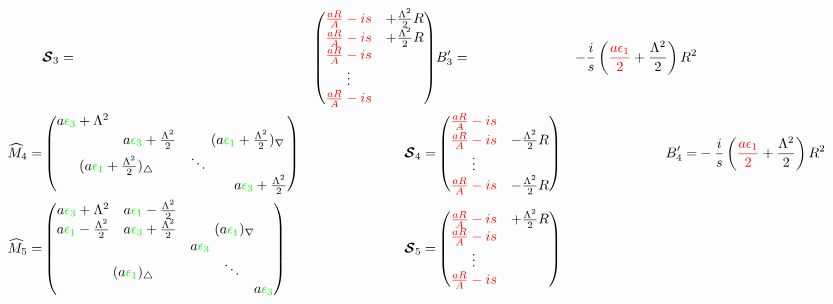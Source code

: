 \documentclass[aps,prd,onecolumn
,tightenlines,letterpaper,
notitlepage,11pt,
nofootinbib]{revtex4-1}
\begin{document}
\begin{align*}
&
\ve{\cS}_3 =&\begin{pmatrix}\red{\frac{aR}{A}-is}&+\frac{\Lambda^2}{2}R\\\red{\frac{aR}{A}-is}&+\frac{\Lambda^2}{2}R \\ \red{\frac{aR}{A}-is}&\\\vdots&\\
\red{\frac{aR}{A}-is}\end{pmatrix}
&
B'_3=&-\frac{i}{s}\left(\red{\frac{a\epsilon_1}{2}}+\frac{\Lambda^2}{2}\right)R^2
\\
\cM_4 =&
\begin{pmatrix}
a\green{\epsilon_3}+\Lambda^2 & & & \\ 
& a\green{\epsilon_3}+\frac{\Lambda^2}{2} & &\multicolumn{2}{l}{\!\!\!\!(a\green{\epsilon_1}+\frac{\Lambda^2}{2})_\nabla} \\
 \multicolumn{2}{c}{(a\green{\epsilon_1}+\frac{\Lambda^2}{2})_\triangle} & \ddots & \\
  & & & & a\green{\epsilon_3}+\frac{\Lambda^2}{2} \\
\end{pmatrix}
&
\ve{\cS}_4 =&\begin{pmatrix}\red{\frac{aR}{A}-is}&\\\red{\frac{aR}{A}-is}&-\frac{\Lambda^2}{2}R \\
\vdots&\\ \red{\frac{aR}{A}-is}&-\frac{\Lambda^2}{2}R\end{pmatrix}
&
B'_4=&-\frac{i}{s}\left(\red{\frac{a\epsilon_1}{2}}+\frac{\Lambda^2}{2}\right)R^2
\\
\cM_5 =&
\begin{pmatrix}
a\green{\epsilon_3}+\Lambda^2 & a\green{\epsilon_1}-\frac{\Lambda^2}{2} & & &\\ 
a\green{\epsilon_1}-\frac{\Lambda^2}{2} & a\green{\epsilon_3}+\frac{\Lambda^2}{2} & &\multicolumn{2}{l}{\!\!\!\!(a\green{\epsilon_1})_\nabla} \\
&& a\green{\epsilon_3} &&\\
 \multicolumn{3}{c}{(a\green{\epsilon_1})_\triangle} & \ddots & \\
  & & & & a\green{\epsilon_3} \\
\end{pmatrix}
&
\ve{\cS}_5 =&\begin{pmatrix}\red{\frac{aR}{A}-is}&+\frac{\Lambda^2}{2}R\\\red{\frac{aR}{A}-is}& \\
\vdots&\\ \red{\frac{aR}{A}-is}&\end{pmatrix}

\end{align*}
\end{document}
